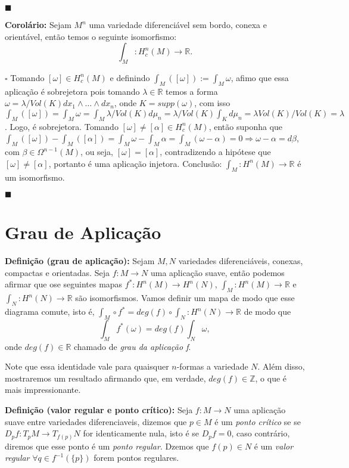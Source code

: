 \documentclass{article}
\begin{document}
	$\blacksquare$
	
	\vspace{2mm}
	\textbf{Corolário:} Sejam $M^{n}$ uma variedade diferenciável sem bordo, conexa e orientável, então temos o seguinte isomorfismo:
	$$
	\int_{M} : H^{n}_{c}(M) \to \mathbb{R}.
	$$
	
	$\square$ Tomando $[\omega] \in H^{n}_{c}(M)$ e definindo $\int_{M} ([\omega]) := \int_{M} \omega$, afimo que essa aplicação é sobrejetora pois tomando $\lambda \in \mathbb{R}$ temos a forma $\omega = \lambda/Vol(K) dx_{1} \wedge \dots \wedge dx_{n}$, onde $K = supp(\omega)$, com isso $\int_{M} ([\omega]) = \int_{M} \omega = \int_{M} \lambda/Vol(K)d\mu_{n} = \lambda/Vol(K)\int_{K} d\mu_{n} = \lambda Vol(K)/Vol(K) = \lambda$. Logo, é sobrejetora. Tomando $[\omega] \neq [\alpha] \in H^{n}_{c}(M)$, então suponha que $\int_{M} ([\omega]) - \int_{M}([\alpha])  = \int_{M} \omega - \int_{M} \alpha = \int_{M} (\omega - \alpha)= 0 \Rightarrow \omega - \alpha = d\beta$, com $\beta \in \Omega^{n-1}(M)$, ou seja, $[\omega] = [\alpha]$, contradizendo a hipótese que $[\omega] \neq [\alpha]$, portanto é uma aplicação injetora. Conclusão: $\int_{M} : H^{n}(M) \to \mathbb{R}$ é um isomorfismo. 
	
	$\blacksquare$
	
	\section{Grau de Aplicação}
	
	\textbf{Definição (grau de aplicação):} Sejam $M,N$ variedades diferenciáveis, conexas, compactas e orientadas. Seja $f: M \to N$ uma aplicação suave, então podemos afirmar que ose seguintes mapas $f^{*}: H^{n}(M) \to H^{n}(N)$, $\int_{M}: H^{n}(M) \to \mathbb{R}$ e $\int_{N}: H^{n}(N) \to \mathbb{R}$ são isomorfismos. Vamos definir um mapa de modo que esse diagrama comute, isto é, $\int_{M} \circ f^{*} = deg(f) \circ \int_{N} :  H^{n}(N) \to \mathbb{R}$ de modo que
	$$
	\int_{M} f^{*}(\omega) = deg(f) \int_{N} \omega,
	$$
	onde $deg(f) \in \mathbb{R}$ chamado de \textit{grau da aplicação f}.
	
	Note que essa identidade vale para quaisquer $n$-formas a variedade $N$. Além disso, mostraremos um resultado afirmando que, em verdade, $deg(f) \in \mathbb{Z}$, o que é mais impressionante.
	
	\vspace{2mm}
	\textbf{Definição (valor regular e ponto crítico):} Seja $f: M \to N$ uma aplicação suave entre variedades diferenciaveis, dizemos que $p \in M$ é um 
	\textit{ponto crítico} se se $D_{p}f : T_{p}M \to T_{f(p)}N$ for identicamente nula, isto é se $D_{p}f = 0$, caso contrário, diremos que esse ponto é um \textit{ponto regular}. Dzemos que $f(p) \in N$ é um \textit{valor regular} $\forall q \in f^{-1}(\{p\})$ forem pontos regulares.
	
\end{document}

